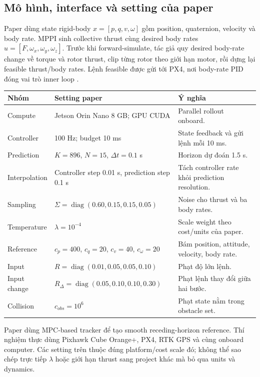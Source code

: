 \documentclass[10pt,a4paper]{article}
\begin{document}
\subsection{Mô hình, interface và setting của paper}

Paper dùng state rigid-body $x=[p,q,v,\omega]$ gồm position, quaternion,
velocity và body rate. MPPI sinh collective thrust cùng desired body rates
$u=[F,\omega_x,\omega_y,\omega_z]$. Trước khi forward-simulate, tác giả quy
desired body-rate change về torque và rotor thrust, clip từng rotor theo giới
hạn motor, rồi dựng lại feasible thrust/body rates. Lệnh feasible được gửi tới
PX4, nơi body-rate PID đóng vai trò inner loop \cite{minarik2024agilemppi}.

\begin{center}
\small
\begin{tabularx}{0.96\textwidth}{L{0.24\textwidth}L{0.23\textwidth}Y}
\toprule
\textbf{Nhóm} & \textbf{Setting paper} & \textbf{Ý nghĩa}\\
\midrule
Compute & Jetson Orin Nano 8 GB; GPU CUDA & Parallel rollout onboard.\\
Controller & 100 Hz; budget 10 ms & State feedback và gửi lệnh mỗi 10 ms.\\
Prediction & $K=896$, $N=15$, $\Delta t=0.1$ s & Horizon dự đoán 1.5 s.\\
Interpolation & Controller step 0.01 s, prediction step 0.1 s & Tách controller rate khỏi prediction resolution.\\
Sampling & $\Sigma=\operatorname{diag}(0.60,0.15,0.15,0.05)$ & Noise cho thrust và ba body rates.\\
Temperature & $\lambda=10^{-4}$ & Scale weight theo cost/units của paper.\\
Reference & $c_p=400$, $c_q=20$, $c_v=40$, $c_\omega=20$ & Bám position, attitude, velocity, body rate.\\
Input & $R=\operatorname{diag}(0.01,0.05,0.05,0.10)$ & Phạt độ lớn lệnh.\\
Input change & $R_\Delta=\operatorname{diag}(0.05,0.10,0.10,0.30)$ & Phạt lệnh thay đổi giữa hai bước.\\
Collision & $c_{obs}=10^6$ & Phạt state nằm trong obstacle set.\\
\bottomrule
\end{tabularx}
\end{center}

Paper dùng MPC-based tracker để tạo smooth receding-horizon reference. Thí
nghiệm thực dùng Pixhawk Cube Orange+, PX4, RTK GPS và cùng onboard computer.
Các setting trên thuộc đúng platform/cost scale đó; không thể sao chép trực tiếp
$\lambda$ hoặc giới hạn thrust sang project khác mà bỏ qua units và dynamics.
\end{document}
